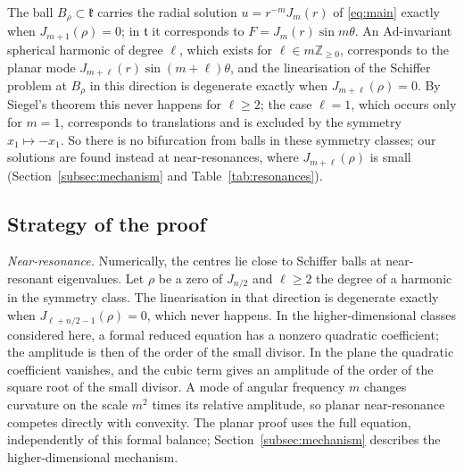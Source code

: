 \documentclass[11pt]{amsart}
\theoremstyle{definition}
\theoremstyle{remark}
\numberwithin{equation}{section}
\newcommand{\Z}{\mathbb{Z}}
\begin{document}
The ball $B_\rho\subset\mathfrak k$ carries the radial solution $u=r^{-m}J_m(r)$ of \eqref{eq:main} exactly when $J_{m+1}(\rho)=0$; in $\mathfrak t$ it corresponds to $F=J_m(r)\sin m\theta$. An $\mathrm{Ad}$-invariant spherical harmonic of degree $\ell$, which exists for $\ell\in m\Z_{\geq0}$, corresponds to the planar mode $J_{m+\ell}(r)\sin(m+\ell)\theta$, and the linearisation of the Schiffer problem at $B_\rho$ in this direction is degenerate exactly when $J_{m+\ell}(\rho)=0$. By Siegel's theorem \cite{Sie29} this never happens for $\ell\geq2$; the case $\ell=1$, which occurs only for $m=1$, corresponds to translations and is excluded by the symmetry $x_1\mapsto-x_1$. So there is no bifurcation from balls in these symmetry classes; our solutions are found instead at near-resonances, where $J_{m+\ell}(\rho)$ is small (Section~\ref{subsec:mechanism} and Table~\ref{tab:resonances}).

\subsection{Strategy of the proof}

\emph{Near-resonance.} Numerically, the centres lie close to Schiffer balls at near-resonant eigenvalues. Let $\rho$ be a zero of $J_{n/2}$ and $\ell\geq2$ the degree of a harmonic in the symmetry class. The linearisation in that direction is degenerate exactly when $J_{\ell+n/2-1}(\rho)=0$, which never happens. In the higher-dimensional classes considered here, a formal reduced equation has a nonzero quadratic coefficient; the amplitude is then of the order of the small divisor. In the plane the quadratic coefficient vanishes, and the cubic term gives an amplitude of the order of the square root of the small divisor. A mode of angular frequency $m$ changes curvature on the scale $m^2$ times its relative amplitude, so planar near-resonance competes directly with convexity. The planar proof uses the full equation, independently of this formal balance; Section~\ref{subsec:mechanism} describes the higher-dimensional mechanism.
\end{document}
